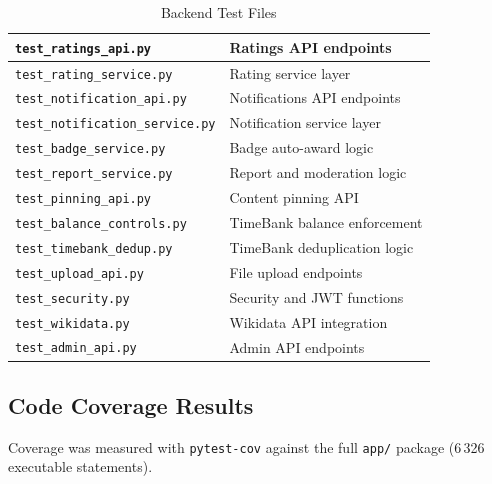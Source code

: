 \documentclass[11pt,a4paper]{report}
\begin{document}
\begin{table}[h]
\begin{tabularx}{\textwidth}{|l|X|}
        \hline
        \texttt{test\_ratings\_api.py}           & Ratings API endpoints        \\
        \hline
        \texttt{test\_rating\_service.py}        & Rating service layer         \\
        \hline
        \texttt{test\_notification\_api.py}      & Notifications API endpoints  \\
        \hline
        \texttt{test\_notification\_service.py}  & Notification service layer   \\
        \hline
        \texttt{test\_badge\_service.py}         & Badge auto-award logic       \\
        \hline
        \texttt{test\_report\_service.py}        & Report and moderation logic  \\
        \hline
        \texttt{test\_pinning\_api.py}           & Content pinning API          \\
        \hline
        \texttt{test\_balance\_controls.py}      & TimeBank balance enforcement \\
        \hline
        \texttt{test\_timebank\_dedup.py}        & TimeBank deduplication logic \\
        \hline
        \texttt{test\_upload\_api.py}            & File upload endpoints        \\
        \hline
        \texttt{test\_security.py}               & Security and JWT functions   \\
        \hline
        \texttt{test\_wikidata.py}               & Wikidata API integration     \\
        \hline
        \texttt{test\_admin\_api.py}             & Admin API endpoints          \\
        \hline
    \end{tabularx}
    \caption{Backend Test Files}
\end{table}

\subsection{Code Coverage Results}

Coverage was measured with \texttt{pytest-cov} against the full \texttt{app/} package (6\,326 executable statements).
\end{document}
